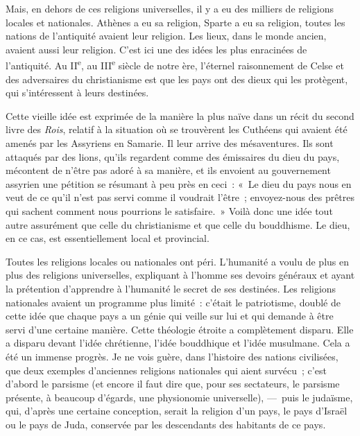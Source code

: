 \documentclass[french,twoside]{book} %
\newcommand\orgName[1]{#1}
\newcommand\placeName[1]{#1}
\begin{document}
Mais, en dehors de ces religions universelles, il y a eu des milliers de religions locales et nationales. Athènes a eu sa religion, Sparte a eu sa religion, toutes les nations de l’antiquité avaient leur religion. Les lieux, dans le monde ancien, avaient aussi leur religion. C’est ici une des idées les plus enracinées de l’antiquité. Au II\textsuperscript{e}, au III\textsuperscript{e} siècle de notre ère, l’éternel raisonnement de Celse et des adversaires du christianisme est que les pays ont des dieux qui les protègent, qui s’intéressent à leurs destinées.\par
Cette vieille idée est exprimée de la manière la plus naïve dans un récit du second livre des {\itshape Rois}, relatif à la situation où se trouvèrent les {\orgName Cuthéens} qui avaient été amenés par les {\orgName Assyriens} en {\placeName Samarie}. Il leur arrive des mésaventures. Ils sont attaqués par des lions, qu’ils regardent comme des émissaires du dieu du pays, mécontent de n’être pas adoré à sa manière, et ils envoient au {\orgName gouvernement assyrien} une pétition se résumant à peu près en ceci : « Le dieu du pays nous en veut de ce qu’il n’est pas servi comme il voudrait l’être ; envoyez-nous des prêtres qui sachent comment nous pourrions le satisfaire. » Voilà donc une idée tout autre assurément que celle du christianisme et que celle du bouddhisme. Le dieu, en ce cas, est essentiellement local et provincial.\par
Toutes les religions locales ou nationales ont péri. L’humanité a voulu de plus en plus des religions universelles, expliquant à l’homme ses devoirs généraux et ayant la prétention d’apprendre à l’humanité le secret de ses destinées. Les religions nationales avaient un programme plus limité : c’était le patriotisme, doublé de cette idée que chaque pays a un génie qui veille sur lui et qui demande à être servi d’une certaine manière. Cette théologie étroite a complètement disparu. Elle a disparu devant l’idée chrétienne, l’idée bouddhique et l’idée musulmane. Cela a été un immense progrès. Je ne vois guère, dans l’histoire des nations civilisées, que deux exemples d’anciennes religions nationales qui aient survécu ; c’est d’abord le parsisme (et encore il faut dire que, pour ses sectateurs, le parsisme présente, à beaucoup d’égards, une physionomie universelle), — puis le judaïsme, qui, d’après une certaine conception, serait la religion d’un pays, le {\orgName pays d’Israël} ou le {\orgName pays de Juda}, conservée par les descendants des habitants de ce pays.\par
\end{document}
